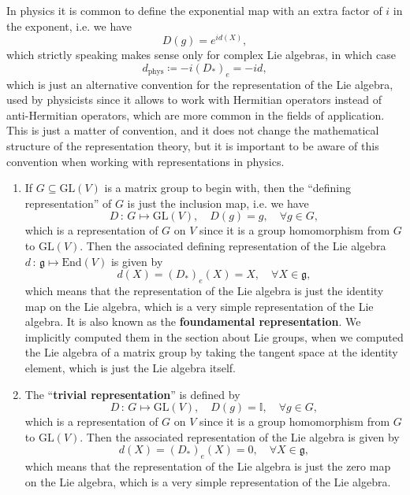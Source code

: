 \begin{remark}
    In physics it is common to define the exponential map with an extra factor of \(i\) in the exponent, i.e. we have
    \[
        D(g) = e^{i d(X)},
    \]
    which strictly speaking makes sense only for complex Lie algebras, in which case
    \[
        d_{\text{phys}} \coloneq -i (D_{\ast})_e = -id,
    \]
    which is just an alternative convention for the representation of the Lie algebra, used by physicists since it allows to work with Hermitian operators instead of anti-Hermitian operators, which are more common in the fields of application. This is just a matter of convention, and it does not change the mathematical structure of the representation theory, but it is important to be aware of this convention when working with representations in physics.
\end{remark}

\begin{example}
    \begin{enumerate}
        \item If \(G \subseteq \mathrm{GL}(V)\) is a matrix group to  begin with, then the ``defining representation'' of \(G\) is just the inclusion map, i.e. we have
              \[
                  D \,:\, G \mapsto \mathrm{GL}(V), \quad D(g) = g, \quad \forall g \in G,
              \]
              which is a representation of \(G\) on \(V\) since it is a group homomorphism from \(G\) to \(\mathrm{GL}(V)\). Then the associated defining representation of the Lie algebra \(d \,:\, \mathfrak{g} \mapsto \mathrm{End}(V)\) is given by
              \[
                  d(X) = (D_*)_e(X) = X, \quad \forall X \in \mathfrak{g},
              \]
              which means that the representation of the Lie algebra is just the identity map on the Lie algebra, which is a very simple representation of the Lie algebra. It is also known as the \textbf{foundamental representation}. We implicitly computed them in the section about Lie groups, when we computed the Lie algebra of a matrix group by taking the tangent space at the identity element, which is just the Lie algebra itself.
        \item The ``\textbf{trivial representation}'' is defined by
              \[
                  D \,:\, G \mapsto \mathrm{GL}(V), \quad D(g) = \mathbb{I}, \quad \forall g \in G,
              \]
              which is a representation of \(G\) on \(V\) since it is a group homomorphism from \(G\) to \(\mathrm{GL}(V)\). Then the associated representation of the Lie algebra is given by
              \[
                  d(X) = (D_*)_e(X) = 0, \quad \forall X \in \mathfrak{g},
              \]
              which means that the representation of the Lie algebra is just the zero map on the Lie algebra, which is a very simple representation of the Lie algebra.
    \end{enumerate}
\end{example}
